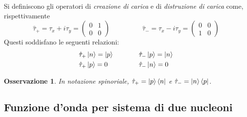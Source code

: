 \documentclass[11pt, a4paper]{scrartcl}
\theoremstyle{style}
\newtheorem{osservazione}{Osservazione}[section]
\numberwithin{equation}{subsection}
\begin{document}
\noindent Si definiscono gli operatori di \textit{creazione di carica} e di \textit{distruzione di carica} come, rispettivamente 
\[
	\hat{\tau} _+ = \tau _x + i \tau _y = \begin{pmatrix} 0 & 1 \\ 0 & 0  \end{pmatrix}  \hspace{2cm} \hat{\tau }_- = \tau _x - i \tau _y = \begin{pmatrix} 0 & 0 \\ 1 &0 \end{pmatrix} 
\] 
Questi soddisfano le seguenti relazioni:
\begin{align*}
	& \hat{\tau }_+ \ket{ n} = \ket{p}  &\hspace{1cm} & \hat{\tau }_- \ket{p}  = \ket{n} \\
	& \hat{\tau }_+ \ket{p}  = 0 & \hspace{1cm} & \hat{\tau }_- \ket{n}  = 0 
\end{align*}
\begin{osservazione}
In notazione spinoriale, $\hat{\tau} _+ = \ket{p} \bra{n} $ e $\hat{\tau }_- = \ket{n} \bra{p} $.
\end{osservazione}

\subsection{Funzione d'onda per sistema di due nucleoni}
\end{document}

